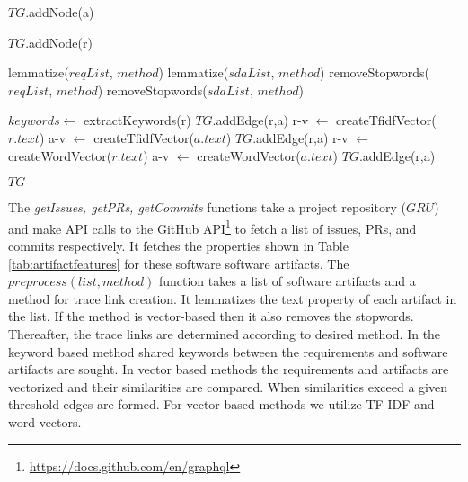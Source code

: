 \begin{breakablealgorithm}
\begin{algorithmic}[1]
 \label{algl:c}
\State $TG$.addNode(a)
\EndFor \label{algl:c}

 \label{algl:c}
\State $TG$.addNode(r)
\EndFor \label{algl:c}


\State lemmatize($reqList$, $method$)
\State lemmatize($sdaList$, $method$)
\State removeStopwords($reqList$, $method$)
\State removeStopwords($sdaList$, $method$)
\EndIf


    \State $keywords \leftarrow$ extractKeywords(r)
        \State $TG$.addEdge(r,a)
    \EndIf
\EndCase
{}
    \State r-v $\leftarrow$ createTfidfVector($r.text$)
    \State a-v $\leftarrow$ createTfidfVector($a.text$)
      \State $TG$.addEdge(r,a)
    \EndIf
\EndCase
{}
    \State r-v $\leftarrow$ createWordVector($r.text$)
    \State a-v $\leftarrow$ createWordVector($a.text$)
        \State $TG$.addEdge(r,a)
    \EndIf
\EndCase
\EndSwitch
\EndFor
\EndFor

\Return $TG$
\end{algorithmic}

\end{breakablealgorithm}

The \textit{getIssues, getPRs, getCommits} functions take a project repository  ($GRU$) and make API calls to the GitHub API\footnote{\url{https://docs.github.com/en/graphql}} to fetch a list of issues, PRs, and commits respectively. 
It fetches the properties shown in Table \ref{tab:artifactfeatures} for these software software artifacts. 
The \textit{$preprocess(list, method)$}  function takes  a list of software artifacts and a method for trace link creation. 
It lemmatizes the text property of each artifact in the list. 
If the method is vector-based then it also removes the stopwords. 
Thereafter, the trace links are determined according to desired method.
In the keyword based method shared keywords between the requirements and software artifacts are sought. In vector based methods the requirements and artifacts are vectorized and their similarities are compared. When similarities exceed a given threshold edges are formed.
For vector-based methods we utilize TF-IDF and word vectors.


